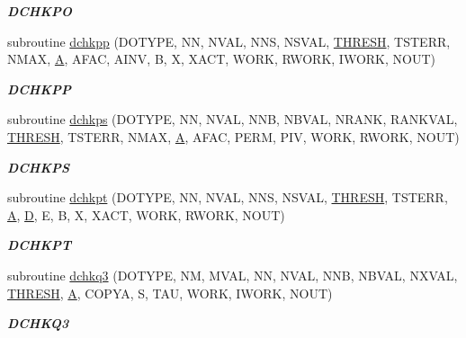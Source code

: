 \begin{DoxyCompactItemize}
\begin{DoxyCompactList}\small\item\em {\bfseries D\+C\+H\+K\+P\+O} \end{DoxyCompactList}\item 
subroutine \hyperlink{group__double__lin_ga4e33e0b2206bf1c76520333b8982df24}{dchkpp} (D\+O\+T\+Y\+P\+E, N\+N, N\+V\+A\+L, N\+N\+S, N\+S\+V\+A\+L, \hyperlink{zlaqgs_8c_a0656018abfc9fa2821827415f5d5ea57}{T\+H\+R\+E\+S\+H}, T\+S\+T\+E\+R\+R, N\+M\+A\+X, \hyperlink{classA}{A}, A\+F\+A\+C, A\+I\+N\+V, B, X, X\+A\+C\+T, W\+O\+R\+K, R\+W\+O\+R\+K, I\+W\+O\+R\+K, N\+O\+U\+T)
\begin{DoxyCompactList}\small\item\em {\bfseries D\+C\+H\+K\+P\+P} \end{DoxyCompactList}\item 
subroutine \hyperlink{group__double__lin_ga90403fbe2988516f5125763f37b0370c}{dchkps} (D\+O\+T\+Y\+P\+E, N\+N, N\+V\+A\+L, N\+N\+B, N\+B\+V\+A\+L, N\+R\+A\+N\+K, R\+A\+N\+K\+V\+A\+L, \hyperlink{zlaqgs_8c_a0656018abfc9fa2821827415f5d5ea57}{T\+H\+R\+E\+S\+H}, T\+S\+T\+E\+R\+R, N\+M\+A\+X, \hyperlink{classA}{A}, A\+F\+A\+C, P\+E\+R\+M, P\+I\+V, W\+O\+R\+K, R\+W\+O\+R\+K, N\+O\+U\+T)
\begin{DoxyCompactList}\small\item\em {\bfseries D\+C\+H\+K\+P\+S} \end{DoxyCompactList}\item 
subroutine \hyperlink{group__double__lin_ga1ec1e1fad10aa87bde3576487239c5e1}{dchkpt} (D\+O\+T\+Y\+P\+E, N\+N, N\+V\+A\+L, N\+N\+S, N\+S\+V\+A\+L, \hyperlink{zlaqgs_8c_a0656018abfc9fa2821827415f5d5ea57}{T\+H\+R\+E\+S\+H}, T\+S\+T\+E\+R\+R, \hyperlink{classA}{A}, \hyperlink{odrpack_8h_a7dae6ea403d00f3687f24a874e67d139}{D}, E, B, X, X\+A\+C\+T, W\+O\+R\+K, R\+W\+O\+R\+K, N\+O\+U\+T)
\begin{DoxyCompactList}\small\item\em {\bfseries D\+C\+H\+K\+P\+T} \end{DoxyCompactList}\item 
subroutine \hyperlink{group__double__lin_ga6b14222c22f71d00af704442279ca310}{dchkq3} (D\+O\+T\+Y\+P\+E, N\+M, M\+V\+A\+L, N\+N, N\+V\+A\+L, N\+N\+B, N\+B\+V\+A\+L, N\+X\+V\+A\+L, \hyperlink{zlaqgs_8c_a0656018abfc9fa2821827415f5d5ea57}{T\+H\+R\+E\+S\+H}, \hyperlink{classA}{A}, C\+O\+P\+Y\+A, S, T\+A\+U, W\+O\+R\+K, I\+W\+O\+R\+K, N\+O\+U\+T)
\begin{DoxyCompactList}\small\item\em {\bfseries D\+C\+H\+K\+Q3} \end{DoxyCompactList}\item 

\end{DoxyCompactItemize}
